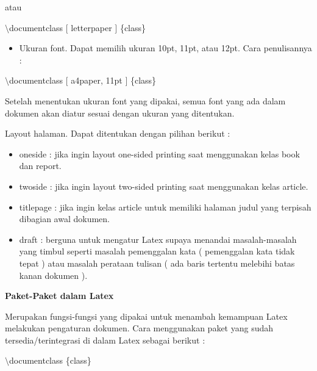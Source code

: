 \hspace{0,5in}atau

\hspace{0,5in}$\setminus$documentclass $[$ letterpaper $]$ \{class\}

\begin{itemize}
\item Ukuran font. Dapat memilih ukuran 10pt, 11pt, atau 12pt. Cara penulisannya :
\end{itemize}
\hspace{0,5in}$\setminus$documentclass $[$ a4paper, 11pt $]$ \{class\}\par \vspace{12pt}

Setelah menentukan ukuran font yang dipakai, semua font yang ada dalam dokumen akan diatur sesuai dengan ukuran yang ditentukan.\par \vspace{12pt}

Layout halaman. Dapat ditentukan dengan pilihan berikut :\par \vspace{12pt}

\begin{itemize}
\item oneside : jika ingin layout one-sided printing saat menggunakan kelas book dan report.
\item twoside : jika ingin layout two-sided printing saat menggunakan kelas article.
\item titlepage : jika ingin kelas article untuk memiliki halaman judul yang terpisah dibagian awal dokumen.
\item draft : berguna untuk mengatur Latex supaya menandai 
masalah-masalah yang timbul seperti masalah pemenggalan kata ( 
pemenggalan kata tidak tepat ) atau masalah perataan tulisan ( ada baris tertentu melebihi batas kanan dokumen ).
\end{itemize}




\textbf{Paket-Paket dalam Latex}\par \vspace{12pt}

Merupakan fungsi-fungsi yang dipakai untuk menambah kemampuan Latex melakukan pengaturan dokumen. Cara menggunakan paket yang sudah tersedia/terintegrasi di dalam Latex sebagai berikut :
\par \vspace{12pt}
$\setminus$documentclass \{class\}\par \vspace{12pt}

